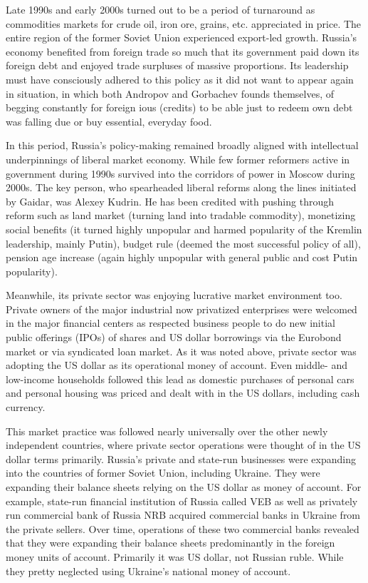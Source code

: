 Late 1990s and early 2000s turned out to be a period of turnaround as
commodities markets for crude oil, iron ore, grains, etc. appreciated in
price. The entire region of the former Soviet Union experienced
export-led growth. Russia's economy benefited from foreign trade so much
that its government paid down its foreign debt and enjoyed trade
surpluses of massive proportions. Its leadership must have consciously
adhered to this policy as it did not want to appear again in situation,
in which both Andropov and Gorbachev founds themselves, of begging
constantly for foreign \acp{iou} (credits) to be able just to redeem own debt
was falling due or buy essential, everyday food.

In this period, Russia's policy-making remained broadly aligned with
intellectual underpinnings of liberal market economy. While few former
reformers active in government during 1990s survived into the corridors
of power in Moscow during 2000s. The key person, who spearheaded liberal
reforms along the lines initiated by Gaidar, was Alexey Kudrin. He has
been credited with pushing through reform such as land market (turning
land into tradable commodity), monetizing social benefits (it turned
highly unpopular and harmed popularity of the Kremlin leadership, mainly
Putin), budget rule (deemed the most successful policy of all), pension
age increase (again highly unpopular with general public and cost Putin
popularity).

Meanwhile, its private sector was enjoying lucrative market environment
too. Private owners of the major industrial now privatized enterprises
were welcomed in the major financial centers as respected business
people to do new initial public offerings (IPOs) of shares and US dollar
borrowings via the Eurobond market or via syndicated loan market. As it
was noted above, private sector was adopting the US dollar as its
operational money of account. Even middle- and low-income
households followed this lead as domestic purchases of personal cars and
personal housing was priced and dealt with in the US dollars, including
cash currency.

This market practice was followed nearly universally over the other
newly independent countries, where private sector operations were
thought of in the US dollar terms primarily. Russia's private and
state-run businesses were expanding into the countries of former Soviet
Union, including Ukraine. They were expanding their balance sheets
relying on the US dollar as money of account. For example,
state-run financial institution of Russia called VEB as well as
privately run commercial bank of Russia NRB acquired commercial banks in
Ukraine from the private sellers. Over time, operations of these two
commercial banks revealed that they were expanding their balance sheets
predominantly in the foreign money units of account. Primarily it was US
dollar, not Russian ruble. While they pretty neglected using Ukraine's
national money of account.

